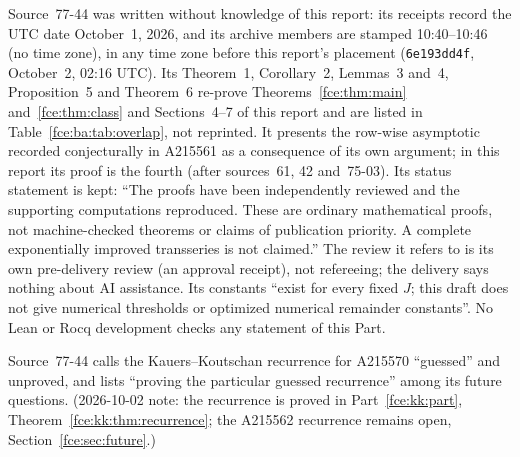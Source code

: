 \documentclass[11pt,a4paper]{article}
\numberwithin{equation}{section}
\theoremstyle{definition}\newtheorem{definition}[theorem]{Definition}
\theoremstyle{remark}\newtheorem{remark}[theorem]{Remark}
\begin{document}
Source~77-44 was written without knowledge of this report: its receipts
record the UTC date October~1, 2026, and its archive members are stamped
10:40--10:46 (no time zone), in any time zone before this report's
placement (\texttt{6e193dd4f}, October~2, 02:16 UTC). Its Theorem~1, Corollary~2, Lemmas~3
and~4, Proposition~5 and Theorem~6 re-prove Theorems~\ref{fce:thm:main}
and~\ref{fce:thm:class} and Sections~4--7 of this report and are listed in
Table~\ref{fce:ba:tab:overlap}, not reprinted. It presents the row-wise
asymptotic recorded conjecturally in A215561 as a consequence of its own
argument; in this report its proof is the fourth (after sources~61, 42
and~75-03). Its status statement is kept: ``The proofs have been
independently reviewed and the supporting computations reproduced. These
are ordinary mathematical proofs, not machine-checked theorems or claims of
publication priority. A complete exponentially improved transseries is not
claimed.'' The review it refers to is its own pre-delivery review (an
approval receipt), not refereeing; the delivery says nothing about AI
assistance. Its constants ``exist for every fixed $J$; this draft does not
give numerical thresholds or optimized numerical remainder constants''. No
Lean or Rocq development checks any statement of this Part.

Source~77-44 calls the Kauers--Koutschan recurrence for A215570 ``guessed''
and unproved, and lists ``proving the particular guessed recurrence'' among
its future questions. (2026-10-02 note: the recurrence is proved in
Part~\ref{fce:kk:part}, Theorem~\ref{fce:kk:thm:recurrence}; the A215562
recurrence remains open, Section~\ref{fce:sec:future}.)
\end{document}
